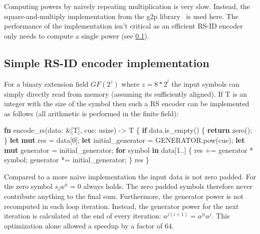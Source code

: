 \documentclass[
]{article}
\newenvironment{Shaded}{}{}
\newcommand{\DataTypeTok}[1]{\textcolor[rgb]{0.56,0.13,0.00}{#1}}
\newcommand{\DecValTok}[1]{\textcolor[rgb]{0.25,0.63,0.44}{#1}}
\newcommand{\KeywordTok}[1]{\textcolor[rgb]{0.00,0.44,0.13}{\textbf{#1}}}
\newcommand{\NormalTok}[1]{#1}
\newcommand{\OperatorTok}[1]{\textcolor[rgb]{0.40,0.40,0.40}{#1}}
\begin{document}
Computing powers by naively repeating multiplication is very slow.
Instead, the square-and-multiply implementation from the g2p library~\cite{Wanzenbock} is used here. The performance of the implementation isn't critical as an
efficient RS-ID encoder only needs to compute a single power (see \cref{simple-rs-id-encoder-implementation}).

\subsection{Simple RS-ID encoder
implementation}\label{simple-rs-id-encoder-implementation}

For a binary extension field \(GF(2^z)\) where \(z=8*2^l\) the input
symbols can simply directly read from memory (assuming its sufficiently
aligned). If T is an integer with the size of the symbol then such a RS
encoder can be implemented as follows (all arithmetic is performed in
the finite field):

\begin{Shaded}
\begin{Highlighting}[]
\KeywordTok{fn}\NormalTok{ encode\_rs(data}\OperatorTok{:} \OperatorTok{\&}\NormalTok{[T]}\OperatorTok{,}\NormalTok{ cue}\OperatorTok{:} \DataTypeTok{usize}\NormalTok{) }\OperatorTok{{-}\textgreater{}}\NormalTok{ T }\OperatorTok{\{}
    \KeywordTok{if}\NormalTok{ data}\OperatorTok{.}\NormalTok{is\_empty() }\OperatorTok{\{}
        \KeywordTok{return}\NormalTok{ zero()}\OperatorTok{;}
    \OperatorTok{\}}
    \KeywordTok{let} \KeywordTok{mut}\NormalTok{ res }\OperatorTok{=}\NormalTok{ data[}\DecValTok{0}\NormalTok{]}\OperatorTok{;}
    \KeywordTok{let}\NormalTok{ initial\_generator }\OperatorTok{=}\NormalTok{ GENERATOR}\OperatorTok{.}\NormalTok{pow(cue)}\OperatorTok{;}
    \KeywordTok{let} \KeywordTok{mut}\NormalTok{ generator }\OperatorTok{=}\NormalTok{ initial\_generator}\OperatorTok{;}
    \KeywordTok{for}\NormalTok{ symbol }\KeywordTok{in}\NormalTok{ data[}\DecValTok{1}\OperatorTok{..}\NormalTok{] }\OperatorTok{\{}
\NormalTok{        res }\OperatorTok{+=}\NormalTok{ generator }\OperatorTok{*}\NormalTok{ symbol}\OperatorTok{;}
\NormalTok{        generator }\OperatorTok{*=}\NormalTok{ initial\_generator}\OperatorTok{;}
    \OperatorTok{\}}
\NormalTok{    res}
\OperatorTok{\}}
\end{Highlighting}
\end{Shaded}

\pagebreak
Compared to a more naive implementation the input data is not zero
padded. For the zero symbol \(s_i a^{j i} = 0\) always holds. The zero
padded symbols therefore never contribute anything to the final sum.
Furthermore, the generator power is not recomputed in each loop
iteration. Instead, the generator power for the next iteration is
calculated at the end of every iteration:
\(a^{j (i + 1)} = a^{j i} a^{j}\). This optimization alone allowed a
speedup by a factor of 64.
\end{document}
